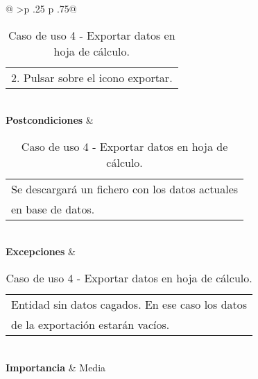 \begin{table}[h]
\begin{tabular}{@{}
			>{}p {.25\textwidth} p {.75\textwidth}@{}}
\begin{tabular}[c]{@{}l@{}}
										2. Pulsar sobre el icono exportar.
									\end{tabular} \\ \midrule
		\textbf{Postcondiciones} &  \begin{tabular}[c]{@{}l@{}}
										Se descargará un fichero con los datos actuales \\
										en base de datos.
									\end{tabular} \\ \midrule
		\textbf{Excepciones}     &  \begin{tabular}[c]{@{}l@{}}
										Entidad sin datos cagados. En ese caso los datos \\
										de la exportación estarán vacíos.\\ 
									\end{tabular} \\ \midrule
		\textbf{Importancia}     &  Media \\ \bottomrule
	\end{tabular}
	\caption{Caso de uso 4 - Exportar datos en hoja de cálculo.}
\end{table}


